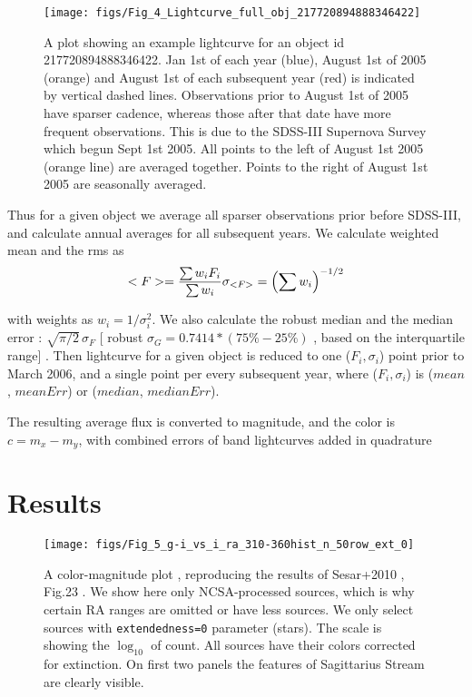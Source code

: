 \documentclass[fleqn,usenatbib]{mnras}  %
\begin{document}
\begin{figure}
\label{fig:lc_example}
 \texttt{[image: figs/Fig\_4\_Lightcurve\_full\_obj\_217720894888346422]}
 \cprotect\caption{A plot showing an example lightcurve for an object id 217720894888346422. Jan 1st of each year (blue),  August 1st of 2005 (orange) and August 1st of each subsequent year (red) is indicated by vertical dashed lines. Observations prior to August 1st of 2005 have sparser cadence, whereas those after that date have more frequent observations.  This is due to the SDSS-III Supernova Survey which begun  Sept 1st 2005.  All points to the left of August 1st 2005 (orange line) are averaged together.  Points to the right of August 1st 2005 are seasonally averaged. }
\end{figure}

Thus for a given object we average all sparser observations prior before SDSS-III, and calculate annual averages for all subsequent years. We calculate weighted mean and the rms as 
\begin{equation}
<F> = \frac{\sum {w_{i}F_{i}}}{\sum{w_{i}}} \\
\sigma_{<F>} = \left( \sum{w_{i}}\right) ^{-1/2} 
\end{equation}

with weights as  $w_{i} = 1 / \sigma_{i}^{2}$. We also calculate the robust  median and the median error : $\sqrt{\pi / 2} \, \sigma_{F}$  [ robust $\sigma_{G} = 0.7414 * (75\% - 25\%) $ , based on the interquartile range] . Then lightcurve for a given object is reduced to one ($F_{i}, \sigma_{i}$) point prior to March 2006, and a single point per every subsequent year, where  ($F_{i}, \sigma_{i}$) is ($mean$, $meanErr$) or ($median$, $medianErr$).


The resulting average flux is converted to magnitude, and the color is  $c = m_{x}-m_{y}$, with combined errors of band lightcurves added in quadrature




\section{Results}
\label{sec:results}


\begin{figure*}
\label{fig:colors_example}
\texttt{[image: figs/Fig\_5\_g-i\_vs\_i\_ra\_310-360hist\_n\_50row\_ext\_0]}
\cprotect\caption{A color-magnitude plot , reproducing the results of Sesar+2010 , Fig.23 .  We show here only NCSA-processed sources, which is why certain RA ranges are omitted or have less sources. We only select sources with \verb|extendedness=0| parameter (stars).  The scale is showing the $\log_{10}$ of count. All sources have their  colors corrected for extinction. On first two panels the features of Sagittarius Stream are clearly visible. }
\end{figure*}
% 
\end{document}
